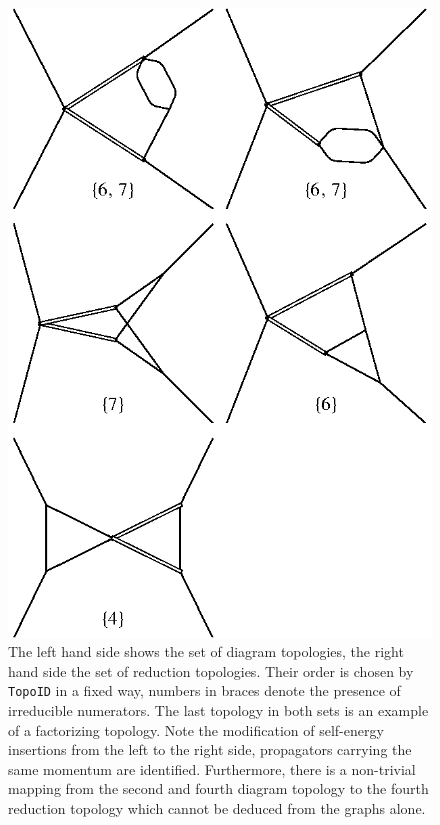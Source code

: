 \documentclass{article}
\begin{document}
\begin{figure}
  \includegraphics[scale=0.6]{NNLOgv22.ptops.eps}
  \caption{%
    The left hand side shows the set of diagram topologies, the right
    hand side the set of reduction topologies.  Their order is chosen by
    {\tt TopoID} in a fixed way, numbers in braces denote the presence
    of irreducible numerators.  The last topology in both sets is an
    example of a factorizing topology.  Note the modification of
    self-energy insertions from the left to the right side, propagators
    carrying the same momentum are identified.  Furthermore, there is a
    non-trivial mapping from the second and fourth diagram topology to
    the fourth reduction topology which cannot be deduced from the
    graphs alone.}
  \label{fig::tops-NNLOgv22}
\end{figure}
\end{document}
